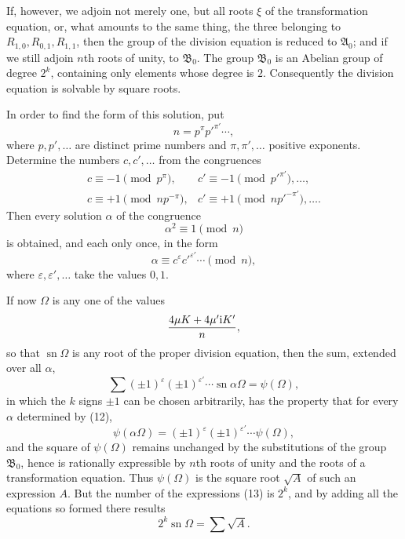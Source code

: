 \documentclass[11pt]{article}
\providecommand{\sn}{\operatorname{sn}}
\providecommand{\ii}{\mathrm{i}}
\begin{document}
If, however, we adjoin not merely one, but all roots $\xi$ of the transformation equation, or,
what amounts to the same thing, the three belonging to $R_{1,0},R_{0,1},R_{1,1}$, then the
group of the division equation is reduced to $\mathfrak A_0$; and if we still adjoin $n$th
roots of unity, to $\mathfrak B_0$. The group $\mathfrak B_0$ is an Abelian group of degree
$2^k$, containing only elements whose degree is $2$. Consequently the division equation is
solvable by square roots.

In order to find the form of this solution, put
\[
 n=p^\pi p'^{\pi'}\cdots,
\]
where $p,p',\ldots$ are distinct prime numbers and $\pi,\pi',\ldots$ positive exponents.
Determine the numbers $c,c',\ldots$ from the congruences
\[
\begin{array}{ll}
 c\equiv-1\pmod {p^\pi},& c'\equiv-1\pmod {p'^{\pi'}},\ldots,\\
 c\equiv+1\pmod {n p^{-\pi}},& c'\equiv+1\pmod {n p'^{-\pi'}},\ldots.
\end{array}
\]
Then every solution $\alpha$ of the congruence
\[
 \alpha^2\equiv1\pmod n
\]
is obtained, and each only once, in the form
\begin{equation}
 \alpha\equiv c^\varepsilon c'^{\varepsilon'}\cdots\pmod n,
\tag{12}
\end{equation}
where $\varepsilon,\varepsilon',\ldots$ take the values $0,1$.

If now $\Omega$ is any one of the values
\[
 {4\mu K+4\mu'\ii K'\over n},
\]
so that $\sn\Omega$ is any root of the proper division equation, then the sum, extended over
all $\alpha$,
\begin{equation}
 \sum(\pm1)^\varepsilon(\pm1)^{\varepsilon'}\cdots\sn\alpha\Omega=\psi(\Omega),
\tag{13}
\end{equation}
in which the $k$ signs $\pm1$ can be chosen arbitrarily, has the property that for every
$\alpha$ determined by (12),
\begin{equation}
 \psi(\alpha\Omega)=(\pm1)^\varepsilon(\pm1)^{\varepsilon'}\cdots\psi(\Omega),
\tag{14}
\end{equation}
and the square of $\psi(\Omega)$ remains unchanged by the substitutions of the group
$\mathfrak B_0$, hence is rationally expressible by $n$th roots of unity and the roots of a
transformation equation. Thus $\psi(\Omega)$ is the square root $\sqrt A$ of such an
expression $A$. But the number of the expressions (13) is $2^k$, and by adding all the
equations so formed there results
\begin{equation}
 2^k\sn\Omega=\sum\sqrt A.
\tag{15}
\end{equation}
\end{document}
